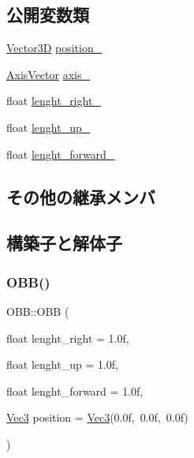 \subsection*{公開変数類}
\begin{DoxyCompactItemize}
\item 
\mbox{\hyperlink{class_vector3_d}{Vector3D}} \mbox{\hyperlink{class_o_b_b_ab05a884fc030d7a3cf7b355880d9194c}{position\+\_\+}}
\item 
\mbox{\hyperlink{class_axis_vector}{Axis\+Vector}} \mbox{\hyperlink{class_o_b_b_ab002fad8cf0a9a08fc50407dc849aab1}{axis\+\_\+}}
\item 
float \mbox{\hyperlink{class_o_b_b_a33c3db74caad2f0827d71ab16e9c5f1d}{lenght\+\_\+right\+\_\+}}
\item 
float \mbox{\hyperlink{class_o_b_b_a4c7f9246708424221b38051cc763ca3c}{lenght\+\_\+up\+\_\+}}
\item 
float \mbox{\hyperlink{class_o_b_b_a999f5165cf4cb28b7b59a75e81613bab}{lenght\+\_\+forward\+\_\+}}
\end{DoxyCompactItemize}
\subsection*{その他の継承メンバ}


\subsection{構築子と解体子}
\mbox{\label{class_o_b_b_a368e87fc4c7cbc04569229010c88f8cc}} 
\subsubsection{\texorpdfstring{O\+B\+B()}{OBB()}}
{\footnotesize\ttfamily O\+B\+B\+::\+O\+BB (\begin{DoxyParamCaption}\item[{float}]{lenght\+\_\+right = {\ttfamily 1.0f},  }\item[{float}]{lenght\+\_\+up = {\ttfamily 1.0f},  }\item[{float}]{lenght\+\_\+forward = {\ttfamily 1.0f},  }\item[{\mbox{\hyperlink{_vector3_d_8h_ab16f59e4393f29a01ec8b9bbbabbe65d}{Vec3}}}]{position = {\ttfamily \mbox{\hyperlink{_vector3_d_8h_ab16f59e4393f29a01ec8b9bbbabbe65d}{Vec3}}(0.0f,~0.0f,~0.0f)} }\end{DoxyParamCaption})\hspace{0.3cm}{\ttfamily [inline]}}


